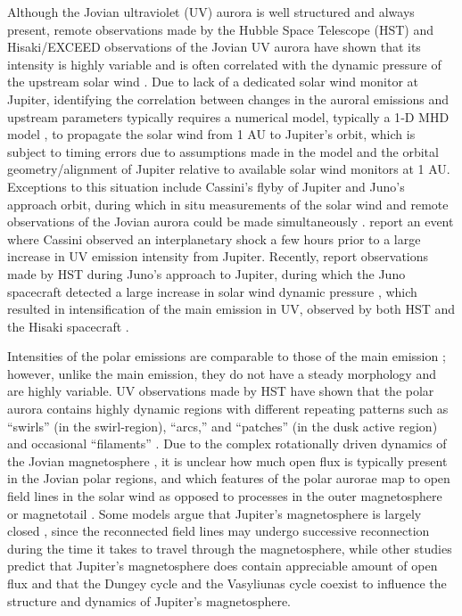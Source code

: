 Although the Jovian ultraviolet (UV) aurora is well structured and always present, remote observations made by the Hubble Space Telescope (HST) and Hisaki/EXCEED observations of the Jovian UV aurora have shown that its intensity is highly variable and is often correlated with the dynamic pressure of the upstream solar wind \cite{Clarke2009,Kimura2015,Kimura2018,Kita2016,Nichols2007a,Nichols2017a}. Due to lack of a dedicated solar wind monitor at Jupiter, identifying the correlation between changes in the auroral emissions and upstream parameters typically requires a numerical model, typically a 1‐D MHD model \cite{Tao2005,Zieger2008}, to propagate the solar wind from 1 AU to Jupiter's orbit, which is subject to timing errors due to assumptions made in the model and the orbital geometry/alignment of Jupiter relative to available solar wind monitors at 1 AU. Exceptions to this situation include Cassini's flyby of Jupiter and Juno's approach orbit, during which in situ measurements of the solar wind and remote observations of the Jovian aurora could be made simultaneously \cite{Gurnett2002a,Nichols2007a,Nichols2017a}.  report an event where Cassini observed an interplanetary shock a few hours prior to a large increase in UV emission intensity from Jupiter. Recently, \cite{Nichols2017a} report observations made by HST during Juno's approach to Jupiter, during which the Juno spacecraft detected a large increase in solar wind dynamic pressure \cite{Wilson2018}, which resulted in intensification of the main emission in UV, observed by both HST and the Hisaki spacecraft \cite{Kimura2017}.

Intensities of the polar emissions are comparable to those of the main emission \cite{Grodent2003a}; however, unlike the main emission, they do not have a steady morphology and are highly variable. UV observations made by HST have shown that the polar aurora contains highly dynamic regions with different repeating patterns such as “swirls” (in the swirl‐region), “arcs,” and “patches” (in the dusk active region) and occasional “filaments” \cite{Bonfond2017,Grodent2015,Grodent2003a,Nichols2009a}. Due to the complex rotationally driven dynamics of the Jovian magnetosphere \cite{Vasyliunas1983a}, it is unclear how much open flux is typically present in the Jovian polar regions, and which features of the polar aurorae map to open field lines in the solar wind as opposed to processes in the outer magnetosphere or magnetotail \cite{Cowley2003a}. Some models argue that Jupiter's magnetosphere is largely closed \cite{McComas2007}, since the reconnected field lines may undergo successive reconnection during the time it takes to travel through the magnetosphere, while other studies predict that Jupiter's magnetosphere does contain appreciable amount of open flux \cite{Cowley2008,Masters2017,Vogt2011a} and that the Dungey cycle \cite{Dungey1961b} and the Vasyliunas cycle coexist to influence the structure and dynamics of Jupiter's magnetosphere. 

